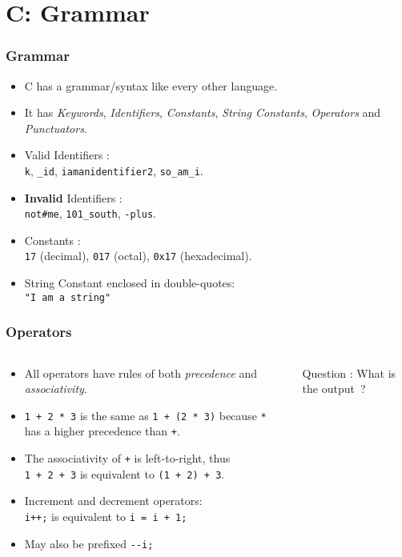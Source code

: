 \section{C: Grammar}

\begin{frame}[fragile]
\frametitle{Grammar}
\begin{itemize}[<+->]
\item  C has a grammar/syntax like every other language.
\item  It has {\it Keywords}, {\it Identifiers}, {\it Constants}, {\it String Constants}, {\it Operators} and {\it Punctuators}.
\item
Valid Identifiers :\\
\verb+k+,
\verb+_id+,
\verb+iamanidentifier2+,
\verb+so_am_i+.
\item  {\bf Invalid} Identifiers :\\
\verb+not#me+,
\verb+101_south+,
\verb+-plus+.
\item  Constants :\\
\verb+17+ (decimal),
\verb+017+ (octal),
\verb+0x17+ (hexadecimal).
\item  String Constant enclosed in double-quotes:\\
\verb+"I am a string"+
\end{itemize}
\end{frame}

\begin{frame}[fragile]
\frametitle{Operators}

\begin{columns}
\begin{column}{0.5\textwidth}
\begin{itemize}[<+->]
\item All operators have rules of both {\it precedence}
and {\it associativity}.
\item  \verb$1 + 2 * 3$ is the same as
\verb$1 + (2 * 3)$ because \verb$*$ has
a higher precedence than \verb$+$.
\item  The associativity of \verb$+$ is left-to-right, thus\\
\verb$1 + 2 + 3$ is equivalent to
\verb$(1 + 2) + 3$.
\item  Increment and decrement operators:\\
\verb$i++;$ is equivalent to \verb$i = i + 1;$
\item  May also be prefixed \verb$--i;$
\end{itemize}
\end{column}

\begin{column}{0.5\textwidth}

{Question : What is the output~?}
\end{column}

\end{columns}
\end{frame}

